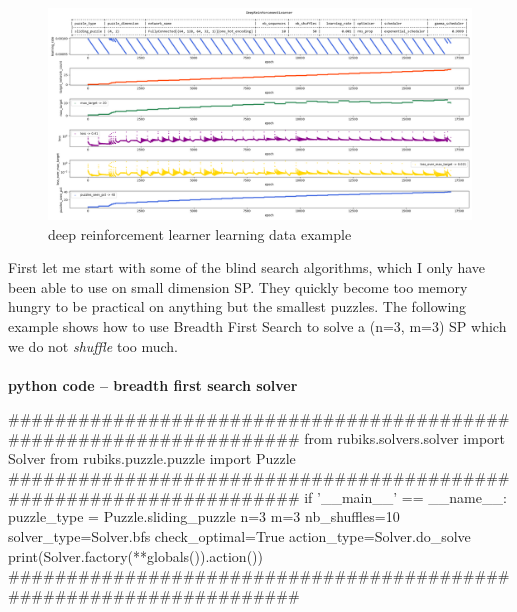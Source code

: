 \begin{landscape}
\centering\vspace*{\fill}
\begin{figure}[H]
\centering
\includegraphics[scale=0.55]{./Figures/exampledeepreinforcementlearnerlearning}
\caption[Examples]{deep reinforcement learner learning data example}
\label{fig:exampledeepreinforcementlearnerlearning}
\end{figure}
\vfill
\end{landscape}
\restoregeometry







First let me start with some of the blind search algorithms, which I only have been able to use on small dimension SP. They quickly become too memory hungry to be practical on anything but the smallest puzzles.
\label{BFSSS}
The following example shows how to use Breadth First Search to solve a (n=3, m=3) SP which we do not \textit{shuffle} too much.

\afblue
\paragraph{}{\textbf{python code -- breadth first search solver}}
\begin{python}
####################################################################
from rubiks.solvers.solver import Solver
from rubiks.puzzle.puzzle import Puzzle
####################################################################
if '__main__' == __name__:
    puzzle_type = Puzzle.sliding_puzzle
    n=3
    m=3
    nb_shuffles=10
    solver_type=Solver.bfs
    check_optimal=True
    action_type=Solver.do_solve
    print(Solver.factory(**globals()).action())
####################################################################
\end{python}
\black

